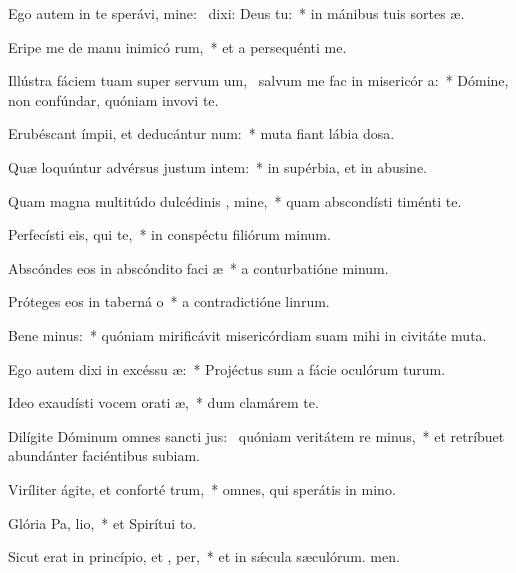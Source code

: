 \item Ego autem in te sperávi, mine:~\pscross{} dixi: Deus   tu:~* in mánibus tuis sortes æ.
\item Eripe me de manu inimicó rum,~* et a persequénti me.
\item Illústra fáciem tuam super servum um,~\pscross{} salvum me fac in misericór a:~* Dómine, non confúndar, quóniam invovi te.
\item Erubéscant ímpii, et deducántur  num:~* muta fiant lábia dosa.
\item Quæ loquúntur advérsus justum intem:~* in supérbia, et in abusine.
\item Quam magna multitúdo dulcédinis , mine,~* quam abscondísti timénti te.
\item Perfecísti eis, qui   te,~* in conspéctu filiórum minum.
\item Abscóndes eos in abscóndito faci æ~* a conturbatióne minum.
\item Próteges eos in taberná o~* a contradictióne linrum.
\item Bene minus:~* quóniam mirificávit misericórdiam suam mihi in civitáte muta.
\item Ego autem dixi in excéssu  æ:~* Projéctus sum a fácie oculórum turum.
\item Ideo exaudísti vocem orati æ,~* dum clamárem  te.
\item Dilígite Dóminum omnes sancti jus:~\pscross{} quóniam veritátem re minus,~* et retríbuet abundánter faciéntibus subiam.
\item Viríliter ágite, et conforté  trum,~* omnes, qui sperátis in mino.
\item Glória Pa,  lio,~* et Spirítui to.
\item Sicut erat in princípio, et ,  per,~* et in sǽcula sæculórum. men.

